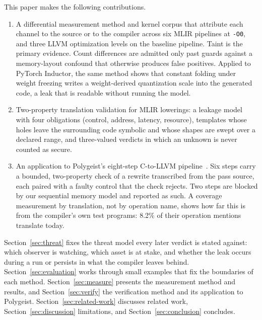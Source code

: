 This paper makes the following contributions.
\begin{enumerate}
  \item A differential measurement method and kernel corpus that
    attribute each channel to the source or to the compiler across six
    MLIR pipelines at \texttt{-O0}, and three LLVM optimization levels on
    the baseline pipeline. Taint is the
    primary evidence. Count differences are admitted only past guards
    against a memory-layout confound that otherwise produces false
    positives. Applied to PyTorch Inductor, the same method shows that
    constant folding under weight freezing writes a weight-derived
    quantization scale into the generated code, a leak that is
    readable without running the model.
  \item Two-property translation validation for MLIR lowerings: a
    leakage model with four obligations (control, address, latency,
    resource), templates whose holes leave the surrounding code symbolic
    and whose shapes are swept over a declared range, and three-valued
    verdicts in which an unknown is never counted as secure.
  \item An application to Polygeist's eight-step C-to-LLVM
    pipeline~\cite{moses2021polygeist}.
    Six steps carry a bounded, two-property check of a rewrite
    transcribed from the pass source, each paired with a faulty control
    that the check rejects. Two steps are blocked by our sequential
    memory model and reported as such. A coverage measurement by
    translation, not by operation name, shows how far this is from the
    compiler's own test programs: 8.2\% of their operation mentions
    translate today.
\end{enumerate}

Section~\ref{sec:threat} fixes the threat model every later verdict is
stated against: which observer is watching, which asset is at stake,
and whether the leak occurs during a run or persists in what the
compiler leaves behind. Section~\ref{sec:evaluation} works through small
examples that fix the boundaries of each method.
Section~\ref{sec:measure} presents the measurement method and results,
and Section~\ref{sec:verify} the verification method and its
application to Polygeist. Section~\ref{sec:related-work} discusses related
work, Section~\ref{sec:discussion} limitations, and
Section~\ref{sec:conclusion} concludes.
